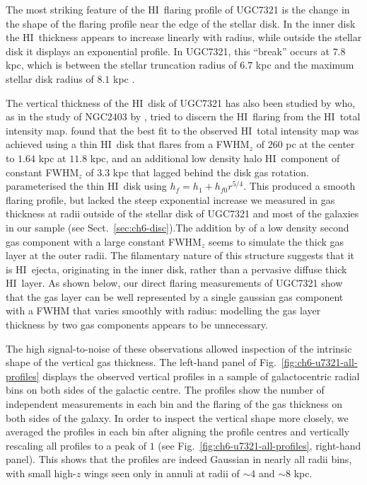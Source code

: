 \documentclass[traditabstract]{aa} %
\newcommand\HI{H{\small I}}
\begin{document}
The most striking feature of the \HI\ flaring profile of UGC7321 is the change in the
shape of the flaring profile near the edge of the stellar disk. In the inner disk the 
\HI\ thickness appears to increase linearly with radius, 
while outside the stellar disk it
displays an exponential profile. In UGC7321, this ``break'' occurs at $7.8$ kpc, 
which is between the stellar truncation radius of $6.7$ kpc \citep{pbld2003} and the 
maximum stellar disk radius of $8.1$ kpc \citep{mw2003}. 

The vertical thickness of the \HI\ disk of UGC7321 has also been
studied by \citet{mw2003} who, as in the study of NGC2403 by \citet{fvmso2002},
tried to discern the \HI\ flaring from the \HI\ total intensity
map. \citet{mw2003} found that the best fit to the observed \HI\ total
intensity map was achieved using a thin \HI\ disk that flares from a
FWHM$_z$ of $260$ pc at the center to $1.64$ kpc at $11.8$ kpc, and 
an additional low density halo 
\HI\ component of constant FWHM$_z$ of $3.3$ kpc that lagged 
behind the disk gas rotation.  \citet{mw2003} parameterised the thin \HI\ disk 
using $h_f = h_1 + h_{f0} r^{5/4}$. This produced a smooth flaring profile, but 
lacked the steep exponential increase we measured in gas thickness at radii outside 
of the stellar disk of UGC7321 and most of the galaxies in our sample (see
Sect.~\ref{sec:ch6-disc}).The addition by \citet{mw2003} of a low density second gas
component with a large constant FWHM$_z$ seems to simulate the thick
gas layer at the outer radii. The filamentary nature of
this structure suggests that it is \HI\ ejecta, originating in the inner
disk, rather than a pervasive diffuse thick \HI\ layer. 
As shown below, our direct flaring measurements of UGC7321
   show that the gas layer can be well represented by a single gaussian
   gas component with a FWHM that varies smoothly with radius: modelling
   the gas layer thickness by two gas components appears to be
   unnecessary.


The high signal-to-noise of these observations allowed
inspection of the intrinsic shape of the vertical gas thickness. The left-hand
panel of Fig.~\ref{fig:ch6-u7321-all-profiles} displays the observed vertical
profiles in a sample of galactocentric radial bins on both sides of
the galactic centre. The profiles show the number of independent
measurements in each bin and the flaring of the gas thickness on both
sides of the galaxy. In order to inspect the vertical shape more
closely, we averaged the profiles in each bin after aligning the
profile centres and vertically rescaling all profiles to a peak of $1$
(see Fig.~\ref{fig:ch6-u7321-all-profiles}, right-hand panel). 
This shows that the profiles are indeed Gaussian in nearly all radii bins, with 
small high-$z$ wings seen only in annuli at radii of $\sim$4 and $\sim$8 kpc.
\end{document}
